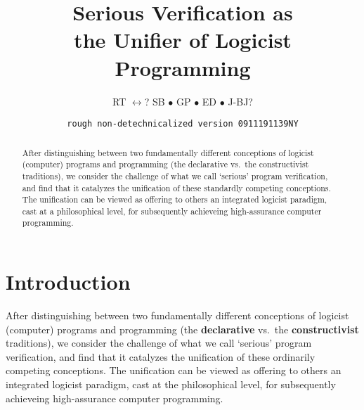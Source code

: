 \documentclass[11pt]{article}
\begin{document}
  \title{\textbf{Serious Verification as\\
                 the Unifier of Logicist Programming}}
  \author{RT $\leftrightarrow$? SB $\bullet$ GP $\bullet$ ED $\bullet$ J-BJ?}
  \date{\texttt{rough non-detechnicalized version 0911191139NY}}
  \maketitle


  \begin{abstract}
    \noindent
%
      After distinguishing between two fundamentally different
      conceptions of logicist (computer) programs and programming (the
      declarative vs.\ the constructivist traditions), we consider the
      challenge of what we call `serious' program verification, and
      find that it catalyzes the unification of these standardly
      competing conceptions.  The unification can be viewed as
      offering to others an integrated logicist paradigm, cast at a
      philosophical level, for subsequently achieveing high-assurance
      computer programming.
  \end{abstract}

\thispagestyle{empty}





\newpage
\thispagestyle{empty}

  \begin{small}
    \tableofcontents
  \end{small}






  \newpage



  \section{Introduction}
  \label{sect:intro}
 
    After distinguishing between two fundamentally different
    conceptions of logicist (computer) programs and programming (the
    \textbf{declarative} vs.\ the \textbf{constructivist} traditions),
    we consider the challenge of what we call `serious' program
    verification, and find that it catalyzes the unification of these
    ordinarily competing conceptions.  The unification can be viewed
    as offering to others an integrated logicist paradigm, cast at the
    philosophical level, for subsequently achieveing high-assurance
    computer programming.
\end{document}
